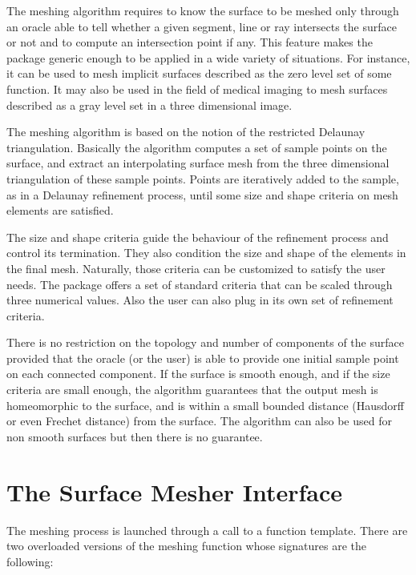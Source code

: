The meshing algorithm requires to know the surface to be meshed
only  through an oracle able to  tell whether a
given segment, line or ray intersects the surface or not
and to compute an intersection point if any.
This feature makes the package generic enough to be
applied in a wide variety of situations. For instance, it can be
used to mesh implicit surfaces described as the zero level set
of some function. It may also be used in the field of medical imaging
to mesh surfaces described as a gray
level set in a three dimensional image.


The meshing algorithm is based on the notion of the restricted
Delaunay triangulation. Basically the algorithm  computes a set of
sample points on the surface, and extract an interpolating 
surface mesh  from the three dimensional triangulation of these 
sample points. Points are iteratively added to the sample,
as in a Delaunay refinement process, until some size and shape
criteria on mesh elements are satisfied. 


The size and shape criteria guide the  behaviour of
the refinement process and control its termination.
They also condition  the size and shape of the elements in the final
mesh. Naturally, those criteria can be customized to satisfy
the user needs. The  package offers
a set of standard criteria that can be scaled through
three numerical values. Also the user can also plug in its own 
set of refinement criteria.

There is no restriction on the topology and number of components
of the surface provided that the oracle (or the user)
is able to provide one initial sample point on each connected component.
If the surface is smooth enough, and if the size criteria are
small enough, the algorithm guarantees 
that the output mesh is homeomorphic to the
surface, and  is within a small bounded distance
(Hausdorff or even Frechet distance) from the surface.
The algorithm can also be used for non smooth surfaces
but then there is no guarantee. 




\section{The Surface Mesher Interface}
\label{SurfaceMesher_section_interface}

The meshing process is launched through a call to a function template.
There are two overloaded versions of the meshing function
whose signatures are the following:

